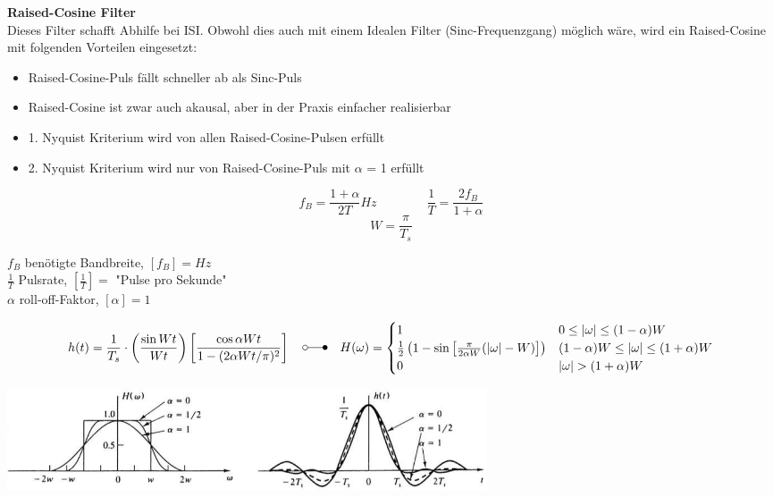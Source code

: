 \textbf{Raised-Cosine Filter} \\
Dieses Filter schafft Abhilfe bei ISI. Obwohl dies auch mit einem Idealen Filter
(Sinc-Frequenzgang) möglich wäre, wird ein Raised-Cosine mit folgenden Vorteilen eingesetzt:
\begin{itemize}
  \item Raised-Cosine-Puls fällt schneller ab als Sinc-Puls
  \item Raised-Cosine ist zwar auch akausal, aber in der Praxis einfacher realisierbar
  \item 1. Nyquist Kriterium wird von allen Raised-Cosine-Pulsen erfüllt
  \item 2. Nyquist Kriterium wird nur von Raised-Cosine-Puls mit $\alpha$ = 1 erfüllt
\end{itemize}

\begin{minipage}{9cm}
$$ f_B = \frac{1 + \alpha}{2 T} Hz \qquad \qquad \frac{1}{T} = \frac{2 f_B}{1 + \alpha}$$
$$ W = \frac{\pi}{T_s}$$
\end{minipage}
\begin{minipage}{9cm}
	$f_B$ benötigte Bandbreite, $[f_B] = Hz$ \\
	$\frac{1}{T}$ Pulsrate, $[\frac{1}{T}] = $ "Pulse pro Sekunde" \\
	$\alpha$ roll-off-Faktor, $[\alpha] = 1$ 
\end{minipage}

$$ 
h(t) = \frac{1}{T_s} \cdot \left( \frac{\sin{W t}}{W t} \right) \left[ \frac{\cos{\alpha W t}}{1
- (2 \alpha W t / \pi)^2}\right]
\quad \laplace \quad
H(\omega) = \begin{cases}
	1 			
		&  	0 \leq | \omega | \leq (1-\alpha) W       \\
	\frac{1}{2} \left( 1 - \sin\left[ \frac{\pi}{2 \alpha W} (| \omega | - W)\right] \right)      
		&	(1-\alpha) W \leq | \omega | \leq (1+\alpha) W       \\
	0
		& 	| \omega | > (1+\alpha) W
            \end{cases}
$$

\begin{center}  
		\includegraphics[height=3cm]{bilder/dig_raisedcosinefilter.png}
\end{center}


